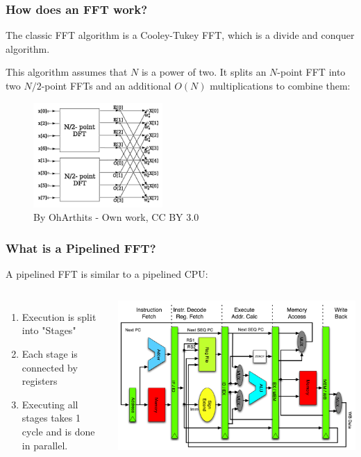 \documentclass{beamer}
\begin{document}
\begin{frame}
	\frametitle{How does an FFT work?}
	The classic FFT algorithm is a Cooley-Tukey FFT, which is a divide and conquer algorithm.

	\pause
	This algorithm assumes that $N$ is a power of two. It splits an $N$-point FFT into two $N/2$-point
	FFTs and an additional $O(N)$ multiplications to combine them:

	\pause
	\begin{figure}
		\includegraphics[height=4cm]{DIT-FFT-butterfly.png}
		\caption{By OhArthits - Own work, CC BY 3.0}
		\centering
	\end{figure}

\end{frame}

\begin{frame}
	\frametitle{What is a Pipelined FFT?}
	A pipelined FFT is similar to a pipelined CPU:
	\begin{columns}
		\begin{enumerate}
			\item Execution is split into "Stages"
			\pause
			\item Each stage is connected by registers
			\pause
			\item Executing all stages takes 1 cycle and is done in parallel.
		\end{enumerate}
		\onslide
		\centering
		\includegraphics[width=\linewidth]{Pipeline_MIPS.png}
	\end{columns}

\end{frame}
\end{document}
